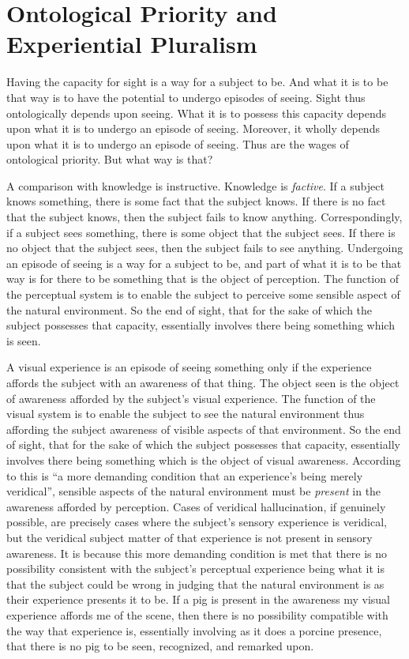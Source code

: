 \documentclass[12pt]{article}
\begin{document}

\section{Ontological Priority and Experiential Pluralism} %
\label{sec:ontological_dependence_and_experiential_pluralism}

Having the capacity for sight is a way for a subject to be. And what it is to be that way is to have the potential to undergo episodes of seeing. Sight thus ontologically depends upon seeing. What it is to possess this capacity depends upon what it is to undergo an episode of seeing. Moreover, it wholly depends upon what it is to undergo an episode of seeing. Thus are the wages of ontological priority. But what way is that?

A comparison with knowledge is instructive. Knowledge is \emph{factive}. If a subject knows something, there is some fact that the subject knows. If there is no fact that the subject knows, then the subject fails to know anything. Correspondingly, if a subject sees something, there is some object that the subject sees. If there is no object that the subject sees, then the subject fails to see anything. Undergoing an episode of seeing is a way for a subject to be, and part of what it is to be that way is for there to be something that is the object of perception. The function of the perceptual system is to enable the subject to perceive some sensible aspect of the natural environment. So the end of sight, that for the sake of which the subject possesses that capacity, essentially involves there being something which is seen.

A visual experience is an episode of seeing something only if the experience affords the subject with an awareness of that thing. The object seen is the object of awareness afforded by the subject's visual experience. The function of the visual system is to enable the subject to see the natural environment thus affording the subject awareness of visible aspects of that environment. So the end of sight, that for the sake of which the subject possesses that capacity, essentially involves there being something which is the object of visual awareness. According to \citet[245]{McDowell:2010fk} this is ``a more demanding condition that an experience's being merely veridical'', sensible aspects of the natural environment must be \emph{present} in the awareness afforded by perception. Cases of veridical hallucination, if genuinely possible, are precisely cases where the subject's sensory experience is veridical, but the veridical subject matter of that experience is not present in sensory awareness. It is because this more demanding condition is met that there is no possibility consistent with the subject's perceptual experience being what it is that the subject could be wrong in judging that the natural environment is as their experience presents it to be. If a pig is present in the awareness my visual experience affords me of the scene, then there is no possibility compatible with the way that experience is, essentially involving as it does a porcine presence, that there is no pig to be seen, recognized, and remarked upon.
\end{document}
